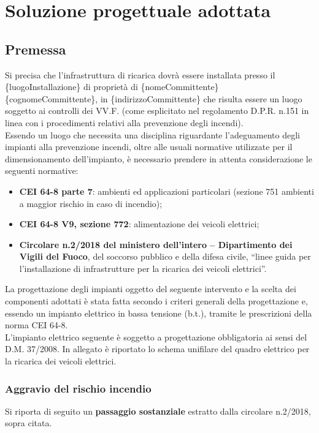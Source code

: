 \newpage
\pagestyle{fancy}

\section{Soluzione progettuale adottata}

\subsection{Premessa}
Si precisa che l’infrastruttura di ricarica dovrà essere installata presso il \{luogoInstallazione\} di proprietà di \{nomeCommittente\} \{cognomeCommittente\}, in \{indirizzoCommittente\} che risulta essere un luogo soggetto ai controlli dei VV.F. (come esplicitato nel regolamento D.P.R. n.151 in linea con i procedimenti relativi alla prevenzione degli incendi). \\
Essendo un luogo che necessita una disciplina riguardante l’adeguamento degli impianti alla prevenzione incendi, oltre alle usuali normative utilizzate per il dimensionamento dell’impianto, è necessario prendere in attenta considerazione le seguenti normative:

\begin{itemize}
    \item \textbf{CEI 64-8 parte 7}: ambienti ed applicazioni particolari (sezione 751 ambienti a maggior rischio in caso di incendio);
    \item \textbf{CEI 64-8 V9, sezione 772}: alimentazione dei veicoli elettrici;
    \item \textbf{Circolare n.2/2018 del ministero dell’intero – Dipartimento dei Vigili del Fuoco}, del soccorso pubblico e della difesa civile, “linee guida per l’installazione di infrastrutture per la ricarica dei veicoli elettrici”. 
\end{itemize}
La progettazione degli impianti oggetto del seguente intervento e la scelta dei componenti adottati è stata fatta secondo i criteri generali della progettazione e, essendo un impianto elettrico in bassa tensione (b.t.), tramite le prescrizioni della norma CEI 64-8. \\
L’impianto elettrico seguente è soggetto a progettazione obbligatoria ai sensi del D.M. 37/2008.
In allegato è riportato lo schema unifilare del quadro elettrico per la ricarica dei veicoli elettrici.


\subsubsection{Aggravio del rischio incendio}
Si riporta di seguito un \textbf{passaggio sostanziale} estratto dalla circolare n.2/2018, sopra citata.

